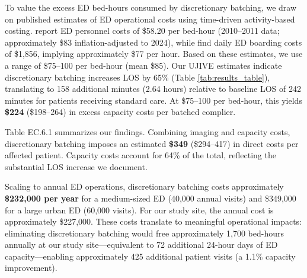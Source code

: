 \documentclass[11pt]{article}
\newcommand{\1}{\hbox{\rm 1\kern-.35em 1}}
\begin{document}
To value the excess ED bed-hours consumed by discretionary batching, we draw on published estimates of ED operational costs using time-driven activity-based costing. \citet{schreyer2017economics} report ED personnel costs of \$58.20 per bed-hour (2010--2011 data; approximately \$83 inflation-adjusted to 2024), while \citet{canellas2024measurement} find daily ED boarding costs of \$1,856, implying approximately \$77 per hour. Based on these estimates, we use a range of \$75--100 per bed-hour (mean \$85). Our UJIVE estimates indicate discretionary batching increases LOS by 65\% (Table \ref{tab:results_table}), translating to 158 additional minutes (2.64 hours) relative to baseline LOS of 242 minutes for patients receiving standard care. At \$75--100 per bed-hour, this yields \textbf{\$224} (\$198--264) in excess capacity costs per batched complier.

Table EC.6.1 summarizes our findings. Combining imaging and capacity costs, discretionary batching imposes an estimated \textbf{\$349} (\$294--417) in direct costs per affected patient. Capacity costs account for 64\% of the total, reflecting the substantial LOS increase we document.

Scaling to annual ED operations, discretionary batching costs approximately \textbf{\$232,000 per year} for a medium-sized ED (40,000 annual visits) and \$349,000 for a large urban ED (60,000 visits). For our study site, the annual cost is approximately \$227,000. These costs translate to meaningful operational impacts: eliminating discretionary batching would free approximately 1,700 bed-hours annually at our study site---equivalent to 72 additional 24-hour days of ED capacity---enabling approximately 425 additional patient visits (a 1.1\% capacity improvement).
\end{document}
